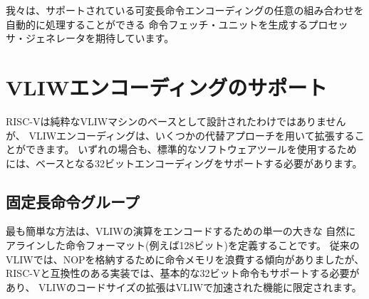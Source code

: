 \begin{commentary}
\begin{comment}
We anticipate processor generators that produce instruction-fetch
units capable of automatically handling any combination of supported
variable-length instruction encodings.
\end{comment}
我々は、サポートされている可変長命令エンコーディングの任意の組み合わせを自動的に処理することができる
命令フェッチ・ユニットを生成するプロセッサ・ジェネレータを期待しています。
\end{commentary}

\begin{comment}
\section{Supporting VLIW encodings}
\end{comment}
\section{VLIWエンコーディングのサポート}

\begin{comment}
Although RISC-V was not designed as a base for a pure VLIW machine,
VLIW encodings can be added as extensions using several alternative
approaches. In all cases, the base 32-bit encoding has to be supported
to allow use of any standard software tools.
\end{comment}
RISC-Vは純粋なVLIWマシンのベースとして設計されたわけではありませんが、
VLIWエンコーディングは、いくつかの代替アプローチを用いて拡張することができます。
いずれの場合も、標準的なソフトウェアツールを使用するためには、ベースとなる32ビットエンコーディングをサポートする必要があります。

\begin{comment}
\subsection*{Fixed-size instruction group}
\end{comment}
\subsection*{固定長命令グループ}

\begin{comment}
The simplest approach is to define a single large naturally aligned
instruction format (e.g., 128 bits) within which VLIW operations are
encoded.  In a conventional VLIW, this approach would tend to waste
instruction memory to hold NOPs, but a RISC-V-compatible
implementation would have to also support the base 32-bit
instructions, confining the VLIW code size expansion to
VLIW-accelerated functions.
\end{comment}
最も簡単な方法は、VLIWの演算をエンコードするための単一の大きな
自然にアラインした命令フォーマット(例えば128ビット)を定義することです。
従来のVLIWでは、NOPを格納するために命令メモリを浪費する傾向がありましたが、
RISC-Vと互換性のある実装では、基本的な32ビット命令もサポートする必要があり、
VLIWのコードサイズの拡張はVLIWで加速された機能に限定されます。

